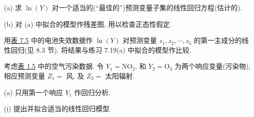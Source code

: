 
\medskip
\noindent (a) 求 $\ln(Y)$ 对一个适当的(“最佳的”)预测变量子集的线性回归方程(估计的).

\noindent (b) 对 (a) 中拟合的模型作残差图, 用以检查正态性假定.

\medskip
{}\quad 用\hyperref[tab:7.5]{表 7.5} 中的电池失效数据作 $\ln(Y)$ 对预测变量 $z_1,z_2,\cdots,z_5$ 的第一主成分的线性回归(见 8.3 节). 将结果与练习 7.19(a) 中拟合的模型作比较.

\medskip
{}\quad 考虑\hyperref[tab:1.5]{表 1.5} 中的空气污染数据. 令 $Y_1=\mathrm{NO}_2$, 和 $Y_2=\mathrm{O}_3$ 为两个响应变量(污染物), 相应预测变量 $Z_1=$ 风, 及 $Z_2=$ 太阳辐射.

\noindent (a) 只用第一个响应 $Y_1$ 作回归分析.

\noindent (i) 提出并拟合适当的线性回归模型.
